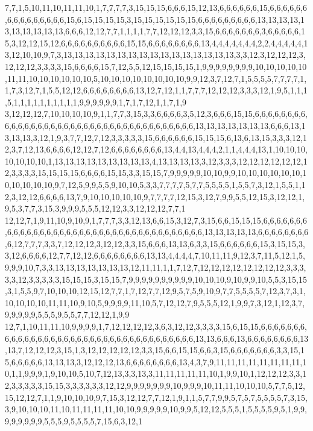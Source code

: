 7,7,1,5,10,11,10,11,11,10,1,7,7,7,7,3,15,15,15,6,6,6,15,12,13,6,6,6,6,6,6,15,6,6,6,6,6,6,6,6,6,6,6,6,6,6,6,15,6,15,15,15,15,3,15,15,15,15,15,15,6,6,6,6,6,6,6,6,6,13,13,13,13,13,13,13,13,13,13,6,6,6,12,12,7,7,1,1,1,1,7,7,12,12,12,3,3,15,6,6,6,6,6,6,6,3,6,6,6,6,6,15,3,12,12,15,12,6,6,6,6,6,6,6,6,6,6,15,15,6,6,6,6,6,6,6,6,13,4,4,4,4,4,4,4,2,2,4,4,4,4,4,13,12,10,10,9,7,3,13,13,13,13,13,13,13,13,13,13,13,13,13,13,13,13,3,3,12,3,12,12,12,3,12,12,12,3,3,3,3,15,6,6,6,6,15,7,12,5,5,12,15,15,15,15,1,9,9,9,9,9,9,9,9,10,10,10,10,10,11,11,10,10,10,10,10,10,5,10,10,10,10,10,10,10,10,9,9,12,3,7,12,7,1,5,5,5,5,7,7,7,7,1,1,7,3,12,7,1,5,5,12,12,6,6,6,6,6,6,6,6,13,12,7,12,1,1,7,7,7,12,12,12,3,3,3,12,1,9,5,1,1,1,5,1,1,1,1,1,1,1,1,1,1,9,9,9,9,9,9,1,7,1,7,12,1,1,7,1,9
3,12,12,12,7,10,10,10,10,9,1,1,7,7,3,15,3,3,6,6,6,6,3,5,12,3,6,6,6,15,15,6,6,6,6,6,6,6,6,6,6,6,6,6,6,6,6,6,6,6,6,6,6,6,6,6,6,6,6,6,6,6,6,6,6,6,6,6,13,13,13,13,13,13,13,6,6,6,13,13,13,13,3,12,1,9,3,7,7,12,7,12,3,3,3,3,3,15,6,6,6,6,6,6,15,15,15,6,13,6,13,15,3,3,3,12,12,3,7,12,13,6,6,6,6,12,12,7,12,6,6,6,6,6,6,6,6,13,4,4,13,4,4,4,2,1,1,4,4,4,13,1,10,10,10,10,10,10,10,1,13,13,13,13,13,13,13,13,13,4,13,13,13,13,3,12,3,3,3,12,12,12,12,12,12,12,3,3,3,3,15,15,15,15,6,6,6,6,15,15,3,3,15,15,7,9,9,9,9,9,10,10,9,9,10,10,10,10,10,10,10,10,10,10,10,9,7,12,5,9,9,5,5,9,10,10,5,3,3,7,7,7,7,5,7,7,5,5,5,5,1,5,5,7,3,12,1,5,5,1,12,3,12,12,6,6,6,6,13,7,9,10,10,10,10,10,9,7,7,7,7,12,15,3,12,7,9,9,5,5,12,15,3,12,12,1,9,5,3,7,7,3,15,3,9,9,9,5,5,5,12,12,3,3,12,12,12,7,7,1
12,12,7,1,9,11,10,9,10,9,1,7,7,7,3,3,12,13,6,6,15,3,12,7,3,15,6,6,15,15,15,6,6,6,6,6,6,6,6,6,6,6,6,6,6,6,6,6,6,6,6,6,6,6,6,6,6,6,6,6,6,6,6,6,6,6,6,6,13,13,13,13,13,6,6,6,6,6,6,6,6,6,12,7,7,7,3,3,7,12,12,12,3,12,12,3,3,15,6,6,6,13,13,6,3,3,15,6,6,6,6,6,6,15,3,15,15,3,3,12,6,6,6,6,12,7,7,12,12,6,6,6,6,6,6,6,6,13,13,4,4,4,4,7,10,11,11,9,12,3,7,11,5,12,1,5,9,9,9,10,7,3,3,13,13,13,13,13,13,13,12,11,11,1,1,7,12,7,12,12,12,12,12,12,12,12,3,3,3,3,3,12,3,3,3,3,3,15,15,15,3,15,15,7,9,9,9,9,9,9,9,9,9,9,10,10,10,9,10,9,9,10,5,5,3,15,15,3,1,5,5,9,7,10,10,10,12,15,12,7,7,1,7,12,7,7,12,9,5,7,5,9,10,9,7,7,5,5,5,5,7,12,3,7,3,1,10,10,10,10,11,11,10,9,10,5,9,9,9,9,11,10,5,7,12,12,7,9,5,5,5,12,1,9,9,7,3,12,1,12,3,7,9,9,9,9,9,5,5,5,9,5,5,7,7,12,12,1,9,9
12,7,1,10,11,11,10,9,9,9,9,1,7,12,12,12,12,3,6,3,12,12,3,3,3,3,15,6,15,15,6,6,6,6,6,6,6,6,6,6,6,6,6,6,6,6,6,6,6,6,6,6,6,6,6,6,6,6,6,6,6,6,6,6,6,6,13,13,6,6,6,13,6,6,6,6,6,6,6,6,13,13,7,12,12,12,3,15,1,3,12,12,12,12,12,3,3,15,6,6,15,15,6,6,3,15,6,6,6,6,6,6,6,3,3,15,15,6,6,6,6,6,13,13,13,3,12,12,12,13,6,6,6,6,6,6,6,6,13,4,3,7,9,11,11,11,11,11,11,11,11,10,1,1,9,9,9,1,9,10,10,5,10,7,12,13,3,3,13,3,11,11,11,11,11,10,1,9,9,10,1,12,12,12,3,3,12,3,3,3,3,3,15,15,3,3,3,3,3,3,12,12,9,9,9,9,9,9,9,10,9,9,9,10,11,11,10,10,10,5,7,7,5,12,15,12,12,7,1,1,9,10,10,10,9,7,15,3,12,12,7,7,12,1,9,1,1,5,7,7,9,9,5,7,5,7,5,5,5,5,7,3,15,3,9,10,10,10,11,10,11,11,11,11,10,10,9,9,9,9,9,10,9,9,5,12,12,5,5,5,1,5,5,5,5,9,5,1,9,9,9,9,9,9,9,9,5,5,5,9,5,5,5,5,7,15,6,3,12,1
